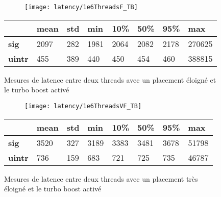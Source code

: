 \begin{figure}[H]
  \begin{subfigure}{\textwidth}
    \texttt{[image: latency/1e6ThreadsF\_TB]}
    \caption{}
    \label{subfig:latency1e6ThreadsF-TB}
  \end{subfigure}
  \begin{subtable}{\textwidth}
    \centering
    \begin{tabular}{| l | l | l | l | l | l | l | l |}
      \hline
      &\bf mean &\bf std &\bf min  &\bf 10\% &\bf 50\% &\bf 95\% &\bf max\\
      \hline
      \bf sig   & 2097 & 282 & 1981 & 2064 & 2082 & 2178 & 270625\\
      \hline
      \bf uintr & 455  & 389 & 440  & 450 & 454 & 460 & 388815\\
      \hline
    \end{tabular}
    \caption{}
    \label{tab:latency1e6ThreadsF-TB}
  \end{subtable}
  \caption{Mesures de latence entre deux threads avec un placement éloigné et le turbo boost activé}
  \label{fig:latency1e6ThreadsF-TB}
\end{figure}

\begin{figure}[H]
  \begin{subfigure}{\textwidth}
    \texttt{[image: latency/1e6ThreadsVF\_TB]}
    \caption{}
    \label{subfig:latency1e6ThreadsVF-TB}
  \end{subfigure}
  \begin{subtable}{\textwidth}
    \centering
    \begin{tabular}{| l | l | l | l | l | l | l | l |}
      \hline
      &\bf mean &\bf std &\bf min  &\bf 10\% &\bf 50\% &\bf 95\% &\bf max\\
      \hline
      \bf sig   & 3520 & 327 & 3189 & 3383 & 3481 & 3678 & 51798\\
      \hline
      \bf uintr & 736  & 159 & 683 & 721 & 725 & 735 & 46787\\
      \hline
    \end{tabular}
    \caption{}
    \label{tab:latency1e6ThreadsVF-TB}
  \end{subtable}
  \caption{Mesures de latence entre deux threads avec un placement très éloigné et le turbo boost activé}
  \label{fig:latency1e6ThreadsVF-TB}
\end{figure}
